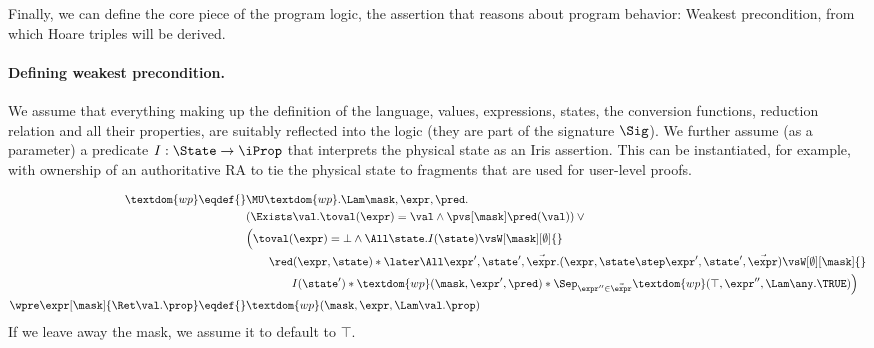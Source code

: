 Finally, we can define the core piece of the program logic, the assertion that reasons about program behavior: Weakest precondition, from which Hoare triples will be derived.

\paragraph{Defining weakest precondition.}
We assume that everything making up the definition of the language, \ie values, expressions, states, the conversion functions, reduction relation and all their properties, are suitably reflected into the logic (\ie they are part of the signature $\Sig$).
We further assume (as a parameter) a predicate $I : \State \to \iProp$ that interprets the physical state as an Iris assertion.
This can be instantiated, for example, with ownership of an authoritative RA to tie the physical state to fragments that are used for user-level proofs.

\begin{align*}
  \textdom{wp} \eqdef{}& \MU \textdom{wp}. \Lam \mask, \expr, \pred. \\
        & (\Exists\val. \toval(\expr) = \val \land \pvs[\mask] \pred(\val)) \lor {}\\
        & \Bigl(\toval(\expr) = \bot \land \All \state. I(\state) \vsW[\mask][\emptyset] {}\\
        &\qquad \red(\expr, \state) * \later\All \expr', \state', \vec\expr. (\expr, \state \step \expr', \state', \vec\expr) \vsW[\emptyset][\mask] {}\\
        &\qquad\qquad I(\state') * \textdom{wp}(\mask, \expr', \pred) * \Sep_{\expr'' \in \vec\expr} \textdom{wp}(\top, \expr'', \Lam \any. \TRUE)\Bigr) \\
  \wpre\expr[\mask]{\Ret\val. \prop} \eqdef{}& \textdom{wp}(\mask, \expr, \Lam\val.\prop)
\end{align*}
If we leave away the mask, we assume it to default to $\top$.

